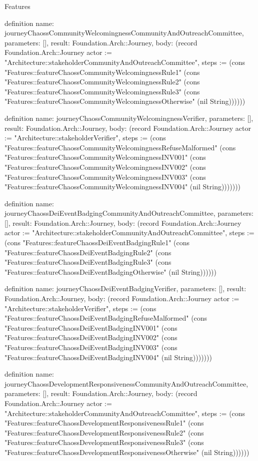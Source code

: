 \begin{lexlean}{Features}
\begin{semanticmodule}
definition{
  name: journeyChaossCommunityWelcomingnessCommunityAndOutreachCommittee,
  parameters: [],
  result: Foundation.Arch::Journey,
  body: (record Foundation.Arch::Journey {actor := "Architecture::stakeholderCommunityAndOutreachCommittee", steps := (cons "Features::featureChaossCommunityWelcomingnessRule1" (cons "Features::featureChaossCommunityWelcomingnessRule2" (cons "Features::featureChaossCommunityWelcomingnessRule3" (cons "Features::featureChaossCommunityWelcomingnessOtherwise" (nil String)))))})
}

definition{
  name: journeyChaossCommunityWelcomingnessVerifier,
  parameters: [],
  result: Foundation.Arch::Journey,
  body: (record Foundation.Arch::Journey {actor := "Architecture::stakeholderVerifier", steps := (cons "Features::featureChaossCommunityWelcomingnessRefuseMalformed" (cons "Features::featureChaossCommunityWelcomingnessINV001" (cons "Features::featureChaossCommunityWelcomingnessINV002" (cons "Features::featureChaossCommunityWelcomingnessINV003" (cons "Features::featureChaossCommunityWelcomingnessINV004" (nil String))))))})
}

definition{
  name: journeyChaossDeiEventBadgingCommunityAndOutreachCommittee,
  parameters: [],
  result: Foundation.Arch::Journey,
  body: (record Foundation.Arch::Journey {actor := "Architecture::stakeholderCommunityAndOutreachCommittee", steps := (cons "Features::featureChaossDeiEventBadgingRule1" (cons "Features::featureChaossDeiEventBadgingRule2" (cons "Features::featureChaossDeiEventBadgingRule3" (cons "Features::featureChaossDeiEventBadgingOtherwise" (nil String)))))})
}

definition{
  name: journeyChaossDeiEventBadgingVerifier,
  parameters: [],
  result: Foundation.Arch::Journey,
  body: (record Foundation.Arch::Journey {actor := "Architecture::stakeholderVerifier", steps := (cons "Features::featureChaossDeiEventBadgingRefuseMalformed" (cons "Features::featureChaossDeiEventBadgingINV001" (cons "Features::featureChaossDeiEventBadgingINV002" (cons "Features::featureChaossDeiEventBadgingINV003" (cons "Features::featureChaossDeiEventBadgingINV004" (nil String))))))})
}

definition{
  name: journeyChaossDevelopmentResponsivenessCommunityAndOutreachCommittee,
  parameters: [],
  result: Foundation.Arch::Journey,
  body: (record Foundation.Arch::Journey {actor := "Architecture::stakeholderCommunityAndOutreachCommittee", steps := (cons "Features::featureChaossDevelopmentResponsivenessRule1" (cons "Features::featureChaossDevelopmentResponsivenessRule2" (cons "Features::featureChaossDevelopmentResponsivenessRule3" (cons "Features::featureChaossDevelopmentResponsivenessOtherwise" (nil String)))))})
}


\end{semanticmodule}
\end{lexlean}
